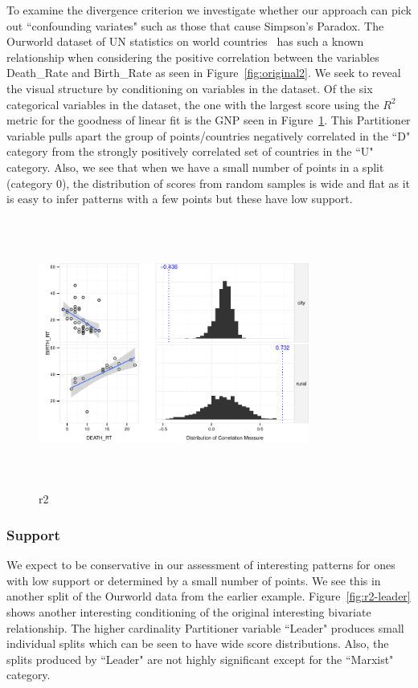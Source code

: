 To examine the divergence criterion we investigate whether our approach can pick out ``confounding variates" such as those that cause Simpson's Paradox. The Ourworld dataset of UN statistics on world countries~\cite{Wilkinson2005GG,Wilkinson2008} has such a known relationship when considering the positive correlation between the variables Death\_Rate and Birth\_Rate as seen in Figure~\ref{fig:original2}. We seek to reveal the visual structure by conditioning on variables in the dataset. Of the six categorical variables in the dataset, the one with the largest score using the $R^2$ metric for the goodness of linear fit is the GNP seen in Figure~\ref{fig:r2}. This Partitioner variable pulls apart the group of points/countries negatively correlated in the ``D" category from the strongly positively correlated set of countries in the ``U" category. Also, we see that when we have a small number of points in a split (category $0$), the distribution of scores from random samples is wide and flat as it is easy to infer patterns with a few points but these have low support.
\begin{figure}
\raggedleft
\includegraphics[width=3.5in,height=3.5in]{images/6_84034106410344-URBAN.pdf}
  \caption{r2}
 \label{fig:r2}
\end{figure}

\subsubsection{Support}
We expect to be conservative in our assessment of interesting patterns for ones with low support or determined by a small number of points. We see this in another split of the Ourworld data from the earlier example. Figure~\ref{fig:r2-leader} shows another interesting conditioning of the original interesting bivariate relationship. The higher cardinality Partitioner variable ``Leader" produces small individual splits which can be seen to have wide score distributions. Also, the splits produced by ``Leader" are not highly significant except for the ``Marxist" category.

